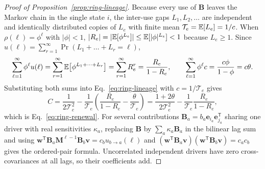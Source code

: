 \begin{proof}[Proof of Proposition~{\upshape\ref{prop:ring-lineage}}]
Because every use of $\mathbf{B}$ leaves the Markov chain in the single state $i$, the inter-use gaps $L_1, L_2, \dots$ are independent and identically distributed copies of $L_e$ with finite mean $\mathcal{T}_e = \mathbb{E}[L_e] = 1/c$. When $\rho(\ell) = \phi^\ell$ with $|\phi| < 1$, $|R_e| = |\mathbb{E}[\phi^{L_e}]| \le \mathbb{E}[|\phi|^{L_e}] < 1$ because $L_e \ge 1$. Since $u(\ell) = \sum_{r=1}^{\infty} \Pr(L_1 + \dots + L_r = \ell)$,
\[
\sum_{\ell=1}^{\infty} \phi^\ell u(\ell) = \sum_{r=1}^{\infty} \mathbb{E}\!\left[\phi^{L_1 + \dots + L_r}\right] = \sum_{r=1}^{\infty} R_e^r = \frac{R_e}{1 - R_e}, \qquad \sum_{\ell=1}^{\infty} \phi^\ell c = \frac{c\phi}{1 - \phi} = c\theta.
\]
Substituting both sums into Eq.~\eqref{eq:ring-lineage} with $c = 1/\mathcal{T}_e$ gives
\[
C = \frac{1}{2\mathcal{T}_e^2} - \frac{1}{\mathcal{T}_e}\left(\frac{R_e}{1 - R_e} - \frac{\theta}{\mathcal{T}_e}\right) = \frac{1 + 2\theta}{2\mathcal{T}_e^2} - \frac{1}{\mathcal{T}_e}\frac{R_e}{1 - R_e},
\]
which is Eq.~\eqref{eq:ring-renewal}. For several contributions $\mathbf{B}_a = b_a \mathbf{e}_{i_a}\mathbf{e}_{j_a}^{\mathsf{T}}$ sharing one driver with real sensitivities $\kappa_a$, replacing $\mathbf{B}$ by $\sum_a \kappa_a \mathbf{B}_a$ in the bilinear lag sum and using $\mathbf{w}^{\mathsf{T}}\mathbf{B}_a\mathbf{M}^{\ell-1}\mathbf{B}_b\mathbf{v} = c_b u_{b \to a}(\ell)$ and $(\mathbf{w}^{\mathsf{T}}\mathbf{B}_a\mathbf{v})(\mathbf{w}^{\mathsf{T}}\mathbf{B}_b\mathbf{v}) = c_a c_b$ gives the ordered-pair formula. Uncorrelated independent drivers have zero cross-covariances at all lags, so their coefficients add.
\end{proof}

